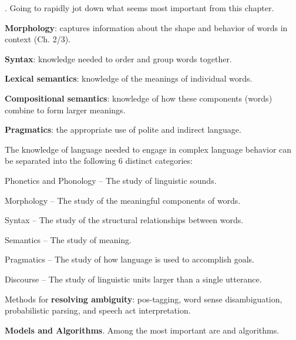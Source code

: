 \documentclass[11pt]{article}
\newcommand\myspace[1][]{\vspace{#1\bigskipamount}}
\newcommand\p{\Needspace{10\baselineskip} \noindent}
\begin{document}
\label{Speech and Language Processing}



\myspace 
\p {}. Going to rapidly jot down what seems most important from this chapter.
\begin{compactitem}
	\item \textbf{Morphology}: captures information about the shape and behavior of words in context (Ch. 2/3).
	
	\item \textbf{Syntax}: knowledge needed to order and group words together.
	
	\item \textbf{Lexical semantics}: knowledge of the meanings of individual words.
	
	\item \textbf{Compositional semantics}: knowledge of how these components (words) combine to form larger meanings.
	
	\item \textbf{Pragmatics}: the appropriate use of polite and indirect language.
	
	\item The knowledge of language needed to engage in complex language behavior can be separated into the following 6 distinct categories:
	\begin{compactenum}
		\item Phonetics and Phonology -- The study of linguistic sounds.
		\item Morphology -- The study of the meaningful components of words.
		\item Syntax -- The study of the structural relationships between words.
		\item Semantics -- The study of meaning.
		\item Pragmatics -- The study of how language is used to accomplish goals.
		\item Discourse -- The study of linguistic units larger than a single utterance.
	\end{compactenum}
	
	\item Methods for \textbf{resolving ambiguity}: pos-tagging, word sense disambiguation, probabilistic parsing, and speech act interpretation.
	
	\item \textbf{Models and Algorithms}. Among the most important are  and  algorithms.
\end{compactitem}
\end{document}
